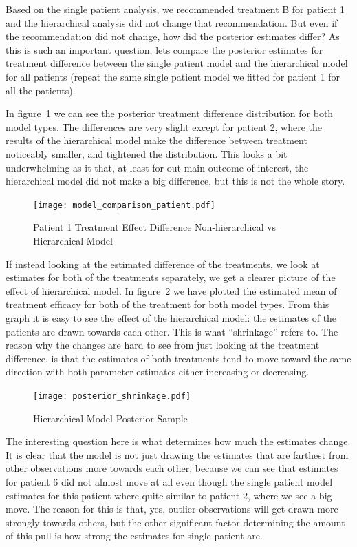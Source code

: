 \documentclass[12pt,a4paper,leqno]{report}
\theoremstyle{plain}
\theoremstyle{definition}
\theoremstyle{remark}
\begin{document}
Based on the single patient analysis, we recommended treatment B for patient 1 and the
hierarchical analysis did not change that recommendation. But even if the recommendation
did not change, how did the posterior estimates differ? As this is such an important
question, lets compare the posterior estimates for treatment difference between the
single patient model and the hierarchical model for all patients (repeat the same
single patient model we fitted for patient 1 for all the patients).

In figure\ \ref{modelcomparisonpatient} we can see the posterior
treatment difference distribution for both model types. The differences are very slight
except for patient 2, where the results of the hierarchical model make the difference
between treatment noticeably smaller, and tightened the distribution. This looks a bit
underwhelming as it that, at least for out main outcome of interest, the hierarchical model did not make a
big difference, but this is not the whole story.

\bigskip
\begin{figure}[H]
    \caption{Patient 1 Treatment Effect Difference Non-hierarchical vs Hierarchical Model}\label{modelcomparisonpatient}
    \bigskip
    \texttt{[image: model\_comparison\_patient.pdf]}
\end{figure}
\bigskip

If instead looking at the estimated difference of the treatments, we look at estimates
for both of the treatments separately, we get a clearer picture of the effect of
hierarchical model. In figure\ \ref{posteriorshrinkage} we have plotted the estimated mean of
treatment efficacy for both of the treatment for both model types. From this graph it is
easy to see the effect of the hierarchical model: the estimates of the patients are drawn
towards each other. This is what ``shrinkage'' refers to. The reason why the changes are
hard to see from just looking at the treatment difference, is that the estimates of both
treatments tend to move toward the same direction with both parameter estimates either
increasing or decreasing.

\bigskip
\begin{figure}[H]
    \caption{Hierarchical Model Posterior Sample}\label{posteriorshrinkage}
    \bigskip
    \centering
    \texttt{[image: posterior\_shrinkage.pdf]}
\end{figure}
\bigskip

The interesting question here is what determines how much the
estimates change. It is clear that the model is not just drawing the estimates that are farthest from other observations
more towards each other, because we can see that estimates for patient 6 did not almost
move at all even though the single patient model estimates for this patient where quite
similar to patient 2, where we see a big move. The reason for this is that, yes, outlier
observations will get drawn more strongly towards others, but the other significant
factor determining the amount of this pull is how strong the estimates for single
patient are.
\end{document}
